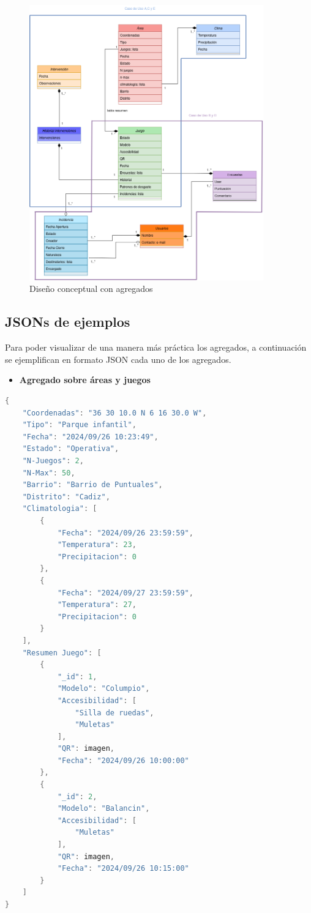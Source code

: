 \documentclass[]{article}
\begin{document}
\begin{figure}[H]
    \centering
    \includegraphics[width=0.9\textwidth]{diagrama_arqui.png}
    \caption{\small Diseño conceptual con agregados}
\end{figure}


\subsection{JSONs de ejemplos}
\label{sub_sec:json_ejemplos}
Para poder visualizar de una manera más práctica los agregados, a continuación se ejemplifican en formato JSON cada uno de los agregados. 
\begin{itemize}
    \item \textbf{Agregado sobre áreas y juegos}
\end{itemize}
\begin{lstlisting}[caption=Ejemplo de JSON para Agregado sobre Áreas y Juegos, language=C]
{
    "Coordenadas": "36 30 10.0 N 6 16 30.0 W",
    "Tipo": "Parque infantil",
    "Fecha": "2024/09/26 10:23:49",
    "Estado": "Operativa",
    "N-Juegos": 2,
    "N-Max": 50,
    "Barrio": "Barrio de Puntuales",
    "Distrito": "Cadiz",
    "Climatologia": [
        {
            "Fecha": "2024/09/26 23:59:59",
            "Temperatura": 23,
            "Precipitacion": 0
        },
        {
            "Fecha": "2024/09/27 23:59:59",
            "Temperatura": 27,
            "Precipitacion": 0
        }
    ],
    "Resumen Juego": [
        {
            "_id": 1,
            "Modelo": "Columpio",
            "Accesibilidad": [
                "Silla de ruedas",
                "Muletas"
            ],
            "QR": imagen,
            "Fecha": "2024/09/26 10:00:00"
        },
        {
            "_id": 2,
            "Modelo": "Balancin",
            "Accesibilidad": [
                "Muletas"
            ],
            "QR": imagen,
            "Fecha": "2024/09/26 10:15:00"
        }
    ]
}
\end{lstlisting}
\end{document}
